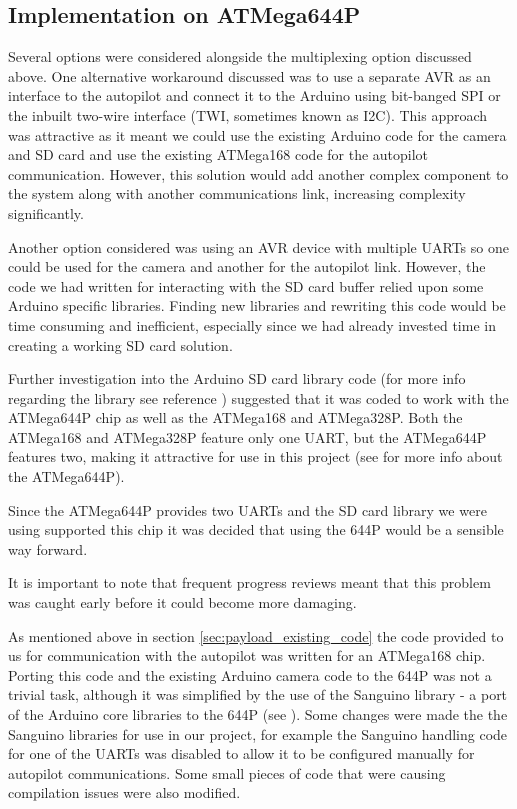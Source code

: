 \subsection{Implementation on ATMega644P}
\label{sec:atmega644p_impl}
Several options were considered alongside the multiplexing option discussed above. One alternative workaround discussed was to use a separate AVR as an interface to the autopilot and connect it to the Arduino using bit-banged SPI or the inbuilt two-wire interface (TWI, sometimes known as I2C). This approach was 
attractive as it meant we could use the existing Arduino code for the camera 
and SD card and use the existing ATMega168 code for the autopilot communication.
However, this solution would add another complex component to the system along
with another communications link, increasing complexity significantly.

Another option considered was using an AVR device with multiple UARTs so one 
could be used for the camera and another for the autopilot link. However, 
the code we had written for interacting with the SD card buffer relied upon 
some Arduino specific libraries. Finding new libraries and rewriting this code 
would be time consuming and inefficient, especially since we had already 
invested time in creating a working SD card solution.

Further investigation into the Arduino SD card library code (for more info
regarding the library see reference \cite{arduino_sd_library}) suggested that
it was coded to work with the ATMega644P chip as well as the ATMega168 and
ATMega328P. Both the ATMega168 and ATMega328P feature only one UART, but the 
ATMega644P features two, making it attractive for use in this project (see
\cite{atmega644p} for more info about the ATMega644P).

Since the ATMega644P provides two UARTs and the SD card library we were using
supported this chip it was decided that using the 644P would be a sensible 
way forward. 

It is important to note that frequent progress reviews meant that this problem
was caught early before it could become more damaging.

As mentioned above in section \ref{sec:payload_existing_code} the code provided
to us for communication with the autopilot was written for an ATMega168 chip. 
Porting this code and the existing Arduino camera code to the 644P was not a 
trivial task, although it was simplified by the use of the Sanguino library -
a port of the Arduino core libraries to the 644P (see \cite{sanguino}). Some 
changes were made the the Sanguino libraries for use in our project, for 
example the Sanguino handling code for one of the UARTs was disabled to allow
it to be configured manually for autopilot communications. Some small pieces
of code that were causing compilation issues were also modified.

